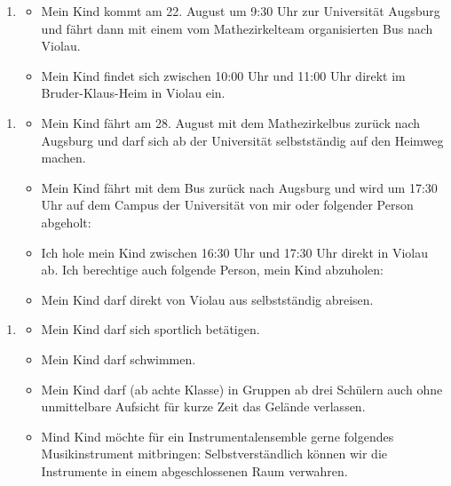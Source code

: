 \documentclass[13pt]{zettel}
\newenvironment{themabox}[1]{%
  \vspace{-0.8em}%
  \begin{enumerate}[labelindent=0pt,labelwidth=2.35cm,itemindent=0em,leftmargin=!,align=left]
    \item[\textbf{#1}]
      \begin{itemize}
}{\end{itemize}\end{enumerate}\vspace{-0.3em}}
\begin{document}
\newpage
\vspace*{-1.5cm}
\small
\singlespacing

\begin{shaded}\begin{themabox}{Anreise}
\item Mein Kind kommt am 22. August um 9:30 Uhr zur Universität Augsburg und fährt dann mit einem vom Mathezirkelteam organisierten Bus nach Violau.
\item Mein Kind findet sich zwischen 10:00 Uhr und 11:00 Uhr direkt im Bruder-Klaus-Heim in Violau ein.
\end{themabox}
\end{shaded}
\vspace{-0.5cm}

\begin{shaded}\begin{themabox}{Abreise}
\item Mein Kind fährt am 28. August mit dem Mathezirkelbus zurück nach Augsburg und darf sich ab der Universität selbstständig auf den Heimweg machen.
\item Mein Kind fährt mit dem Bus zurück nach Augsburg und wird um 17:30 Uhr auf dem Campus der Universität von mir oder folgender Person abgeholt:
\\[0.3cm] \freist{13cm}
\item Ich hole mein Kind zwischen 16:30 Uhr und 17:30 Uhr direkt in Violau ab. Ich berechtige auch folgende Person, mein Kind abzuholen:
\\[0.3cm] \freist{13cm}
\item Mein Kind darf direkt von Violau aus selbstständig abreisen.
\end{themabox}
\end{shaded}

\vspace{-0.5cm}
\begin{shaded}\begin{themabox}{Aktivitäten}
\item Mein Kind darf sich sportlich betätigen.
\item Mein Kind darf schwimmen.
\item Mein Kind darf (ab achte Klasse) in Gruppen ab drei Schülern
auch ohne unmittelbare Aufsicht für kurze Zeit das Gelände verlassen.
\item Mind Kind möchte für ein Instrumentalensemble gerne folgendes Musikinstrument mitbringen:
\freist{7cm} Selbstverständlich können wir die Instrumente in einem
abgeschlossenen Raum verwahren.
\end{themabox}
\end{shaded}
\vspace{-0.5cm}
\end{document}
